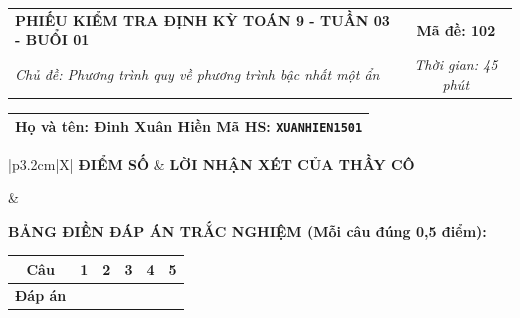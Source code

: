 \documentclass[12pt,a4paper]{article}
\begin{document}
\newpage


\noindent
\begin{tabularx}{\linewidth}{|X|c|}
\hline
\textbf{PHIẾU KIỂM TRA ĐỊNH KỲ TOÁN 9 - TUẦN 03 - BUỔI 01} & \textbf{Mã đề: 102} \\
\textit{Chủ đề: Phương trình quy về phương trình bậc nhất một ẩn} & \textit{Thời gian: 45 phút} \\
\hline
\end{tabularx}

\vspace{1mm}

\noindent
\begin{tabularx}{\linewidth}{|X|}
\hline
\rule[-2mm]{0pt}{7.5mm}\textbf{Họ và tên:} \textbf{\large Đinh Xuân Hiền} \hfill \textbf{Mã HS:} \texttt{XUANHIEN1501} \quad \\
\hline
\end{tabularx}

\vspace{1mm}

\noindent
\begin{tabularx}{\linewidth}{|p{3.2cm}|X|}
\hline
\centering\textbf{ĐIỂM SỐ} & \centering\textbf{LỜI NHẬN XÉT CỦA THẦY CÔ} \tabularnewline
\hline
\rule{0pt}{1.3cm} & \tabularnewline
\hline
\end{tabularx}

\vspace{1.2mm}

\noindent\textbf{BẢNG ĐIỀN ĐÁP ÁN TRẮC NGHIỆM (Mỗi câu đúng 0,5 điểm):}
\vspace{0.8mm}

\noindent
\renewcommand{\arraystretch}{1.35}
\begin{tabularx}{\linewidth}{|c|*{5}{>{\centering\arraybackslash}X|}}
\hline
\textbf{Câu} & \textbf{1} & \textbf{2} & \textbf{3} & \textbf{4} & \textbf{5} \\
\hline
\textbf{Đáp án} & & & & & \\
\hline
\end{tabularx}
\renewcommand{\arraystretch}{1.0}

\vspace{1.5mm}
\end{document}

